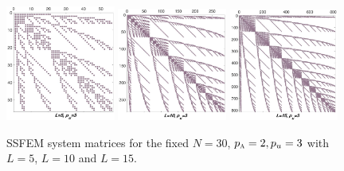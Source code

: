 \documentclass[letter,1p,11pt,oneside,onecolumn,sort&compress]{elsarticle}
\begin{document}
\begin{figure}[htbp]
\centering
 \includegraphics[width=0.32\textwidth,height=0.17\textheight]{plots/L5p3_n30.eps}
 \includegraphics[width=0.32\textwidth,height=0.17\textheight]{plots/L10p3_n30.eps}
 \includegraphics[width=0.32\textwidth,height=0.17\textheight]{plots/L15p3_n30.eps}
 \caption{SSFEM system matrices for the fixed $N=30$, $p_{\textsc{a}} = 2, p_{u} = 3$ with $L=5$, $L=10$ and $L=15$.}
 \label{fig:SFEM1}
\end{figure}
\end{document}
